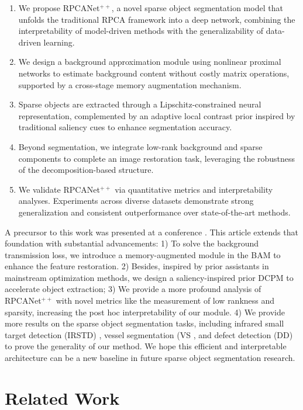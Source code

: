 \documentclass[10pt,journal,compsoc]{IEEEtran}
\begin{document}
\begin{enumerate}[]
\item We propose RPCANet$^{++}$, a novel sparse object segmentation model that unfolds the traditional RPCA framework into a deep network, combining the interpretability of model-driven methods with the generalizability of data-driven learning.
\item We design a background approximation module using nonlinear proximal networks to estimate background content without costly matrix operations, supported by a cross-stage memory augmentation mechanism.
\item Sparse objects are extracted through a Lipschitz-constrained neural representation, complemented by an adaptive local contrast prior inspired by traditional saliency cues to enhance segmentation accuracy.
\item Beyond segmentation, we integrate low-rank background and sparse components to complete an image restoration task, leveraging the robustness of the decomposition-based structure.
\item We validate RPCANet$^{++}$ via quantitative metrics and interpretability analyses. Experiments across diverse datasets demonstrate strong generalization and consistent outperformance over state-of-the-art methods.
\end{enumerate}


A precursor to this work was presented at a conference \cite{wu-2024-rpcanet}. This article extends that foundation with substantial advancements: 1) To solve the background transmission loss, we introduce a memory-augmented module in the BAM to enhance the feature restoration. 2) Besides, inspired by prior assistants in mainstream optimization methods, we design a saliency-inspired prior DCPM to accelerate object extraction; 3) We provide a more profound analysis of RPCANet$^{++}$ with novel metrics like the measurement of low rankness and sparsity, increasing the post hoc \cite{an-2024-interpre} interpretability of our module. 4) We provide more results on the sparse object segmentation tasks, including infrared small target detection (IRSTD) \cite{dai-2021-acm}, vessel segmentation (VS \cite{drive-2014,hoover-2000-stare,chase_db1-2020}, and defect detection (DD) \cite{dong-2019-neuseg,song-2020-MCITF} to prove the generality of our method. We hope this efficient and interpretable architecture can be a new baseline in future sparse object segmentation research.

\section{Related Work}
\label{sec:2}
\end{document}
